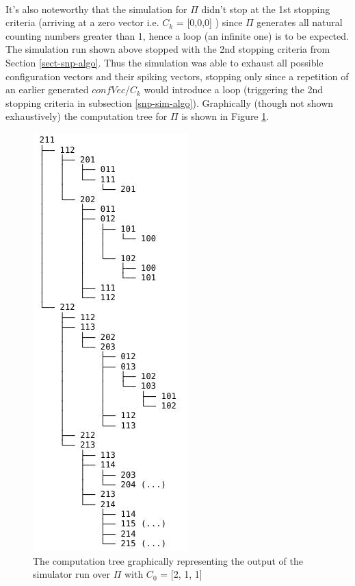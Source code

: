 \documentclass{svmultm}
\begin{document}
~\\
 It's also noteworthy that the simulation for $\Pi$ didn't stop at the 1st stopping criteria (arriving at a zero vector i.e. $C_k$ = [0,0,0] ) since $\Pi$ generates  all natural counting numbers greater than 1, hence a loop (an infinite one) is to be expected. The simulation run shown above stopped with the 2nd stopping criteria from Section \ref{sect-snp-algo}. Thus the simulation was able to exhaust all possible configuration vectors and their spiking vectors, stopping only since a repetition of an earlier generated $confVec$/$C_k$ would introduce a loop (triggering the 2nd stopping criteria in subsection \ref{snp-sim-algo}).
Graphically (though not shown exhaustively) the computation tree for $\Pi$ is shown in Figure \ref{c211_tree}.

	\begin{figure}[tb]
		\centering
		\includegraphics[scale=.7]{figures/c211_tree.jpeg} 
		\caption{The computation tree graphically representing the output of the simulator run over $\Pi$ with $C_0$ = [2, 1, 1]}
		\label{c211_tree}
	\end{figure}
\end{document}

